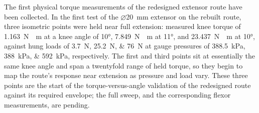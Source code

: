 The first physical torque measurements of the redesigned extensor route have been collected. In the first test of the $\diameter$\qty{20}{\mm} extensor on the rebuilt route, three isometric points were held near full extension: measured knee torque of \qty{1.163}{\newton\cdot\meter} at a knee angle of \ang{10}, \qty{7.849}{\newton\cdot\meter} at \ang{11}, and \qty{23.437}{\newton\cdot\meter} at \ang{10}, against hung loads of \qtylist{3.7;25.2;76}{\newton} at gauge pressures of \qtylist{388.5;388;592}{\kPa}, respectively. The first and third points sit at essentially the same knee angle and span a twentyfold range of held torque, so they begin to map the route's response near extension as pressure and load vary. These three points are the start of the torque-versus-angle validation of the redesigned route against its required envelope; the full sweep, and the corresponding flexor measurements, are pending.


